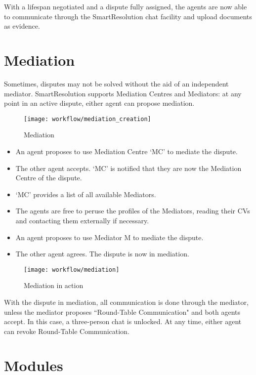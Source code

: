 With a lifespan negotiated and a dispute fully assigned, the agents are now able to communicate through the SmartResolution chat facility and upload documents as evidence.

\section{Mediation}

Sometimes, disputes may not be solved without the aid of an independent mediator. SmartResolution supports Mediation Centres and Mediators: at any point in an active dispute, either agent can propose mediation.

\begin{figure}[ht!]
  \centering
    \ifimages
    \texttt{[image: workflow/mediation\_creation]}
    \fi
    \caption{Mediation}
  \label{workflow:mediation}
\end{figure}

\begin{itemize}
\item An agent proposes to use Mediation Centre `MC' to mediate the dispute.
\item The other agent accepts. `MC' is notified that they are now the Mediation Centre of the dispute.
\item `MC' provides a list of all available Mediators.
\item The agents are free to peruse the profiles of the Mediators, reading their CVs and contacting them externally if necessary.
\item An agent proposes to use Mediator M to mediate the dispute.
\item The other agent agrees. The dispute is now in mediation.
\end{itemize}

\begin{figure}[ht!]
  \centering
    \ifimages
    \texttt{[image: workflow/mediation]}
    \fi
    \caption{Mediation in action}
  \label{workflow:mediationAction}
\end{figure}

With the dispute in mediation, all communication is done through the mediator, unless the mediator proposes ``Round-Table Communication" and both agents accept. In this case, a three-person chat is unlocked. At any time, either agent can revoke Round-Table Communication.

\section{Modules}

